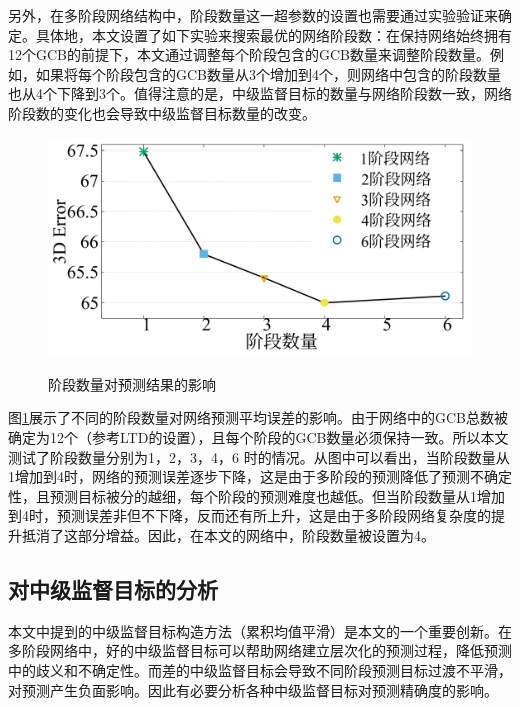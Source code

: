 另外，在多阶段网络结构中，阶段数量这一超参数的设置也需要通过实验验证来确定。具体地，本文设置了如下实验来搜索最优的网络阶段数：在保持网络始终拥有12个GCB的前提下，本文通过调整每个阶段包含的GCB数量来调整阶段数量。例如，如果将每个阶段包含的GCB数量从3个增加到4个，则网络中包含的阶段数量也从4个下降到3个。值得注意的是，中级监督目标的数量与网络阶段数一致，网络阶段数的变化也会导致中级监督目标数量的改变。
\begin{figure}[ht]
    \centering
    \includegraphics[width=0.6\columnwidth]{FigMa/smooth_stage_chinese.pdf} \\
    \caption{阶段数量对预测结果的影响}
    \label{fig:ablation-stage-number}
\end{figure}

图\ref{fig:ablation-stage-number}展示了不同的阶段数量对网络预测平均误差的影响。由于网络中的GCB总数被确定为12个（参考LTD的设置），且每个阶段的GCB数量必须保持一致。所以本文测试了阶段数量分别为1，2，3，4，6 时的情况。从图中可以看出，当阶段数量从1增加到4时，网络的预测误差逐步下降，这是由于多阶段的预测降低了预测不确定性，且预测目标被分的越细，每个阶段的预测难度也越低。但当阶段数量从1增加到4时，预测误差非但不下降，反而还有所上升，这是由于多阶段网络复杂度的提升抵消了这部分增益。因此，在本文的网络中，阶段数量被设置为4。

\subsection{对中级监督目标的分析}
本文中提到的中级监督目标构造方法（累积均值平滑）是本文的一个重要创新。在多阶段网络中，好的中级监督目标可以帮助网络建立层次化的预测过程，降低预测中的歧义和不确定性。而差的中级监督目标会导致不同阶段预测目标过渡不平滑，对预测产生负面影响。因此有必要分析各种中级监督目标对预测精确度的影响。

